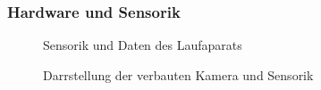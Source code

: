 \subsubsection{Hardware und Sensorik}

\begin{figure}[h]
    \caption{Sensorik und Daten des Laufaparats}\label{fig:laufaparat}
\end{figure}

\begin{figure}[h]
    \caption{Darrstellung der verbauten Kamera und Sensorik}\label{fig:kameras_sensorik}
\end{figure}

